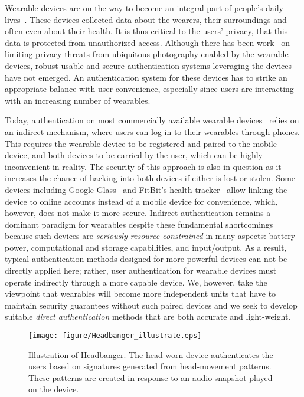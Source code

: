 Wearable devices are on the way to become an integral part of people's daily lives~\cite{googleglass,smartwatch,fitbit}.
These devices collected data about the wearers, their surroundings and often even about their health.
It is thus critical to the users' privacy, that this data is protected from unauthorized access. Although there has been work~\cite{hoyle2015sensitive,hoyle2014privacy,jana2013scanner} on limiting privacy
threats from ubiquitous photography enabled by the wearable devices, robust usable and secure authentication systems
leveraging the devices have not emerged.
An authentication system for these devices has to strike an
appropriate balance with user convenience, especially since users are interacting
with an increasing number of wearables.

\vspace{1mm}
Today, authentication on most commercially available wearable devices~\cite{fitbit, smartwatch} relies on an indirect mechanism, where users
can log in to their wearables through phones. This requires the wearable
device to be registered and paired to the mobile device, and both devices to be carried by the user, which can be highly inconvenient in reality. The security of this
approach is also in question as it increases the chance of hacking into both
devices if either is lost or stolen. Some devices including
Google Glass~\cite{googleglass} and FitBit's health tracker~\cite{fitbit}
allow linking the device to online accounts instead of a mobile device for
convenience,  which, however, does not make it more secure. Indirect authentication
remains a
dominant paradigm for wearables despite these fundamental shortcomings because
such devices are \emph{seriously resource-constrained} in many aspects:
battery power, computational and storage capabilities, and input/output. As a result, typical authentication methods designed for more
powerful devices can not be directly applied here; rather, user authentication for wearable devices must operate indirectly
through a more capable device. We, however, take the viewpoint that wearables will become more independent
units that have to maintain security guarantees without such paired devices
and we seek to develop suitable \emph{direct authentication} methods that are
both accurate and light-weight.
\vspace{-1mm}
\begin{figure}[t!]
\centering
\texttt{[image: figure/Headbanger\_illustrate.eps]}
\caption{Illustration of Headbanger. The head-worn device authenticates the
users based on signatures generated from head-movement patterns.  These patterns are created in
response to an audio snapshot played on the device.}
\label{fig:headbanger-illustrate}
\end{figure}

